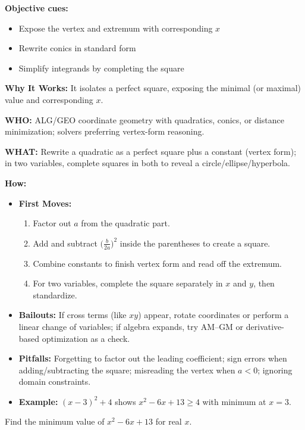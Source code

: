 \documentclass[12pt]{article}
\newenvironment{problem}[1]
{\begin{tcolorbox}[colback=blue!5!white,colframe=blue!75!black,title={#1}]}{\end{tcolorbox}}
\begin{document}
\textbf{Objective cues:}
\begin{itemize}
    \item Expose the vertex and extremum with corresponding $x$
    \item Rewrite conics in standard form
    \item Simplify integrands by completing the square
\end{itemize}

\textbf{Why It Works:} It isolates a perfect square, exposing the minimal (or maximal) value and corresponding $x$.

\textbf{WHO:} ALG/GEO coordinate geometry with quadratics, conics, or distance minimization; solvers preferring vertex-form reasoning.

\textbf{WHAT:} Rewrite a quadratic as a perfect square plus a constant (vertex form); in two variables, complete squares in both to reveal a circle/ellipse/hyperbola.


\textbf{How:}
\begin{itemize}
    \item \textbf{First Moves:}
    \begin{enumerate}[nosep]
        \item Factor out $a$ from the quadratic part.
        \item Add and subtract $\big(\tfrac{b}{2a}\big)^2$ inside the parentheses to create a square.
        \item Combine constants to finish vertex form and read off the extremum.
        \item For two variables, complete the square separately in $x$ and $y$, then standardize.
    \end{enumerate}
    \item \textbf{Bailouts:} If cross terms (like $xy$) appear, rotate coordinates or perform a linear change of variables; if algebra expands, try AM–GM or derivative-based optimization as a check.
    \item \textbf{Pitfalls:} Forgetting to factor out the leading coefficient; sign errors when adding/subtracting the square; misreading the vertex when $a<0$; ignoring domain constraints.
    \item \textbf{Example:} $(x-3)^2+4$ shows $x^2-6x+13\ge 4$ with minimum at $x=3$.
\end{itemize}

\begin{problem}{Example: Minimize $x^2 - 6x + 13$}
Find the minimum value of $x^2 - 6x + 13$ for real $x$.
\end{problem}
\end{document}
